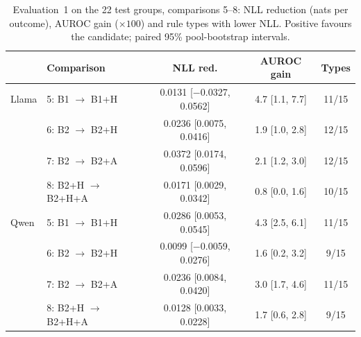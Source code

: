 \documentclass{article}
\newcommand{\cto}{$\rightarrow$}
\begin{document}
\begin{table}[h]
\centering\scriptsize
\caption{Evaluation~1 on the 22 test groups, comparisons 5--8: NLL reduction (nats per outcome), AUROC gain ($\times100$) and rule types with lower NLL. Positive favours the candidate; paired 95\% pool-bootstrap intervals.}
\label{tab:inc_e1}
\begin{tabular}{llccc}
\toprule
 & Comparison & NLL red. & AUROC gain & Types \\
\midrule
Llama & 5: B1 \cto{} B1+H & 0.0131 [$-$0.0327, 0.0562] & 4.7 [1.1, 7.7] & 11/15 \\
 & 6: B2 \cto{} B2+H & 0.0236 [0.0075, 0.0416] & 1.9 [1.0, 2.8] & 12/15 \\
 & 7: B2 \cto{} B2+A & 0.0372 [0.0174, 0.0596] & 2.1 [1.2, 3.0] & 12/15 \\
 & 8: B2+H \cto{} B2+H+A & 0.0171 [0.0029, 0.0342] & 0.8 [0.0, 1.6] & 10/15 \\
\midrule
Qwen & 5: B1 \cto{} B1+H & 0.0286 [0.0053, 0.0545] & 4.3 [2.5, 6.1] & 11/15 \\
 & 6: B2 \cto{} B2+H & 0.0099 [$-$0.0059, 0.0276] & 1.6 [0.2, 3.2] & 9/15 \\
 & 7: B2 \cto{} B2+A & 0.0236 [0.0084, 0.0420] & 3.0 [1.7, 4.6] & 11/15 \\
 & 8: B2+H \cto{} B2+H+A & 0.0128 [0.0033, 0.0228] & 1.7 [0.6, 2.8] & 9/15 \\
\bottomrule
\end{tabular}
\end{table}
\end{document}
